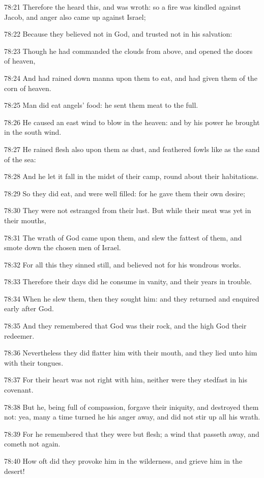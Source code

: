 78:21 Therefore the \LORD heard this, and was wroth: so a fire was kindled against Jacob, and anger also came up against Israel;

78:22 Because they believed not in God, and trusted not in his salvation:

78:23 Though he had commanded the clouds from above, and opened the doors of heaven,

78:24 And had rained down manna upon them to eat, and had given them of the corn of heaven.

78:25 Man did eat angels' food: he sent them meat to the full.

78:26 He caused an east wind to blow in the heaven: and by his power he brought in the south wind.

78:27 He rained flesh also upon them as dust, and feathered fowls like as the sand of the sea:

78:28 And he let it fall in the midst of their camp, round about their habitations.

78:29 So they did eat, and were well filled: for he gave them their own desire;

78:30 They were not estranged from their lust. But while their meat was yet in their mouths,

78:31 The wrath of God came upon them, and slew the fattest of them, and smote down the chosen men of Israel.

78:32 For all this they sinned still, and believed not for his wondrous works.

78:33 Therefore their days did he consume in vanity, and their years in trouble.

78:34 When he slew them, then they sought him: and they returned and enquired early after God.

78:35 And they remembered that God was their rock, and the high God their redeemer.

78:36 Nevertheless they did flatter him with their mouth, and they lied unto him with their tongues.

78:37 For their heart was not right with him, neither were they stedfast in his covenant.

78:38 But he, being full of compassion, forgave their iniquity, and destroyed them not: yea, many a time turned he his anger away, and did not stir up all his wrath.

78:39 For he remembered that they were but flesh; a wind that passeth away, and cometh not again.

78:40 How oft did they provoke him in the wilderness, and grieve him in the desert!


